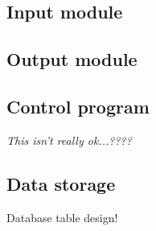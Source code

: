 \subsection{Input module}

\subsection{Output module}

\subsection{Control program}

\textit{This isn't really ok...????}

\subsection{Data storage}\label{sec:res:data}

Database table design!


